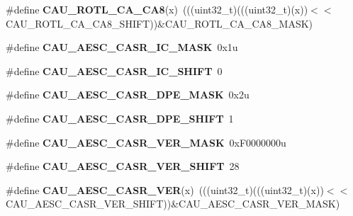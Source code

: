 \begin{DoxyCompactItemize}
\item 
\#define {\bfseries C\+A\+U\+\_\+\+R\+O\+T\+L\+\_\+\+C\+A\+\_\+\+C\+A8}(x)~(((uint32\+\_\+t)(((uint32\+\_\+t)(x))$<$$<$C\+A\+U\+\_\+\+R\+O\+T\+L\+\_\+\+C\+A\+\_\+\+C\+A8\+\_\+\+S\+H\+I\+FT))\&C\+A\+U\+\_\+\+R\+O\+T\+L\+\_\+\+C\+A\+\_\+\+C\+A8\+\_\+\+M\+A\+SK)\hypertarget{group__CAU__Register__Masks_gac4d27277c32faec31fb884c090e0766a}{}\label{group__CAU__Register__Masks_gac4d27277c32faec31fb884c090e0766a}

\item 
\#define {\bfseries C\+A\+U\+\_\+\+A\+E\+S\+C\+\_\+\+C\+A\+S\+R\+\_\+\+I\+C\+\_\+\+M\+A\+SK}~0x1u\hypertarget{group__CAU__Register__Masks_ga1cdbe3e5dcccfef7d740aa8474df5263}{}\label{group__CAU__Register__Masks_ga1cdbe3e5dcccfef7d740aa8474df5263}

\item 
\#define {\bfseries C\+A\+U\+\_\+\+A\+E\+S\+C\+\_\+\+C\+A\+S\+R\+\_\+\+I\+C\+\_\+\+S\+H\+I\+FT}~0\hypertarget{group__CAU__Register__Masks_ga6d38ea3ba55f1a1fdb7f01d217c387ed}{}\label{group__CAU__Register__Masks_ga6d38ea3ba55f1a1fdb7f01d217c387ed}

\item 
\#define {\bfseries C\+A\+U\+\_\+\+A\+E\+S\+C\+\_\+\+C\+A\+S\+R\+\_\+\+D\+P\+E\+\_\+\+M\+A\+SK}~0x2u\hypertarget{group__CAU__Register__Masks_ga40583682054346f72ca37860de1406b6}{}\label{group__CAU__Register__Masks_ga40583682054346f72ca37860de1406b6}

\item 
\#define {\bfseries C\+A\+U\+\_\+\+A\+E\+S\+C\+\_\+\+C\+A\+S\+R\+\_\+\+D\+P\+E\+\_\+\+S\+H\+I\+FT}~1\hypertarget{group__CAU__Register__Masks_gaa13642832bf71bc8d76ef211ee7de360}{}\label{group__CAU__Register__Masks_gaa13642832bf71bc8d76ef211ee7de360}

\item 
\#define {\bfseries C\+A\+U\+\_\+\+A\+E\+S\+C\+\_\+\+C\+A\+S\+R\+\_\+\+V\+E\+R\+\_\+\+M\+A\+SK}~0x\+F0000000u\hypertarget{group__CAU__Register__Masks_ga5439d1e52f7e2cd76ac43c3a82b251ac}{}\label{group__CAU__Register__Masks_ga5439d1e52f7e2cd76ac43c3a82b251ac}

\item 
\#define {\bfseries C\+A\+U\+\_\+\+A\+E\+S\+C\+\_\+\+C\+A\+S\+R\+\_\+\+V\+E\+R\+\_\+\+S\+H\+I\+FT}~28\hypertarget{group__CAU__Register__Masks_ga14f13940abf0f6bc17f633206a387423}{}\label{group__CAU__Register__Masks_ga14f13940abf0f6bc17f633206a387423}

\item 
\#define {\bfseries C\+A\+U\+\_\+\+A\+E\+S\+C\+\_\+\+C\+A\+S\+R\+\_\+\+V\+ER}(x)~(((uint32\+\_\+t)(((uint32\+\_\+t)(x))$<$$<$C\+A\+U\+\_\+\+A\+E\+S\+C\+\_\+\+C\+A\+S\+R\+\_\+\+V\+E\+R\+\_\+\+S\+H\+I\+FT))\&C\+A\+U\+\_\+\+A\+E\+S\+C\+\_\+\+C\+A\+S\+R\+\_\+\+V\+E\+R\+\_\+\+M\+A\+SK)\hypertarget{group__CAU__Register__Masks_ga83db0296057530f6476583f9d45b9e26}{}\label{group__CAU__Register__Masks_ga83db0296057530f6476583f9d45b9e26}


\end{DoxyCompactItemize}
